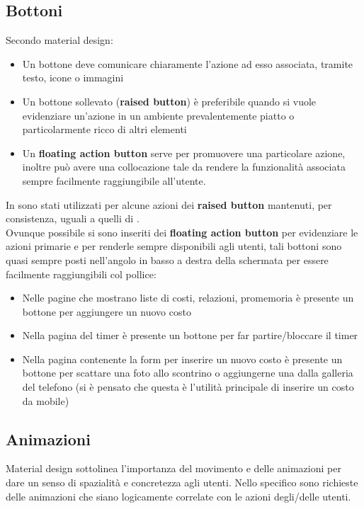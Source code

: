 \subsection{Bottoni}\label{bottoni}
Secondo material design:

\begin{itemize}
\item Un bottone deve comunicare chiaramente l'azione ad esso associata, tramite
testo, icone o immagini
\item Un bottone sollevato (\textbf{raised button}) è preferibile quando si vuole
evidenziare un'azione in un ambiente prevalentemente piatto o particolarmente ricco
di altri elementi
\item Un \textbf{floating action button} serve per promuovere una particolare azione,
inoltre può avere una collocazione tale da rendere la funzionalità associata sempre
facilmente raggiungibile all'utente.
\end{itemize}

In \fiscoloMobile{} sono stati utilizzati per alcune azioni dei \textbf{raised button}
mantenuti, per consistenza, uguali a quelli di \fiscoloWeb{}. \\

Ovunque possibile si sono inseriti dei \textbf{floating action button} per evidenziare
le azioni primarie e per renderle sempre disponibili agli utenti, tali bottoni sono
quasi sempre posti nell'angolo in basso a destra della schermata per essere facilmente
raggiungibili col pollice:

\begin{itemize}
\item Nelle pagine che mostrano liste di costi, relazioni, promemoria è presente un
bottone per aggiungere un nuovo costo
\item Nella pagina del timer è presente un bottone per far partire/bloccare il timer
\item Nella pagina contenente la form per inserire un nuovo costo è presente un bottone
per scattare una foto allo scontrino o aggiungerne una dalla galleria del telefono (si è
pensato che questa è l'utilità principale di inserire un costo da mobile)
\end{itemize}

\subsection{Animazioni}\label{material-animation}
Material design sottolinea l'importanza del movimento e delle animazioni per dare un
senso di spazialità e concretezza agli utenti. Nello specifico sono richieste delle
animazioni che siano logicamente correlate con le azioni degli/delle utenti.

